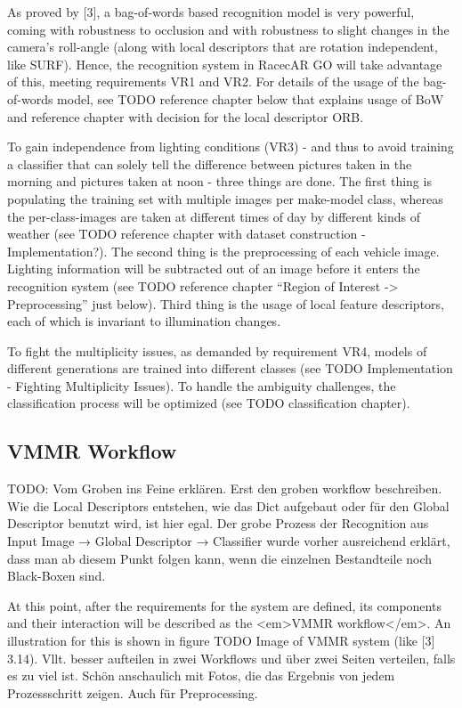 As proved by [3], a bag-of-words based recognition model is very powerful, coming with robustness to occlusion and with robustness to slight changes in the camera’s roll-angle (along with local descriptors that are rotation independent, like SURF). Hence, the recognition system in RacecAR GO will take advantage of this, meeting requirements VR1 and VR2. For details of the usage of the bag-of-words model, see TODO reference chapter below that explains usage of BoW and reference chapter with decision for the local descriptor ORB.

To gain independence from lighting conditions (VR3) - and thus to avoid training a classifier that can solely tell the difference between pictures taken in the morning and pictures taken at noon - three things are done. The first thing is populating the training set with multiple images per make-model class, whereas the per-class-images are taken at different times of day by different kinds of weather (see TODO reference chapter with dataset construction - Implementation?). The second thing is the preprocessing of each vehicle image. Lighting information will be subtracted out of an image before it enters the recognition system (see TODO reference chapter “Region of Interest -> Preprocessing” just below). Third thing is the usage of local feature descriptors, each of which is invariant to illumination changes.

To fight the multiplicity issues, as demanded by requirement VR4, models of different generations are trained into different classes (see TODO Implementation - Fighting Multiplicity Issues). To handle the ambiguity challenges, the classification process will be optimized (see TODO classification chapter).

\subsection{VMMR Workflow}
TODO: Vom Groben ins Feine erklären. Erst den groben workflow beschreiben. Wie die Local Descriptors entstehen, wie das Dict aufgebaut oder für den Global Descriptor benutzt wird, ist hier egal. Der grobe Prozess der Recognition aus Input Image → Global Descriptor → Classifier wurde vorher ausreichend erklärt, dass man ab diesem Punkt folgen kann, wenn die einzelnen Bestandteile noch Black-Boxen sind.

At this point, after the requirements for the system are defined, its components and their interaction will be described as the <em>VMMR workflow</em>. An illustration for this is shown in figure TODO Image of VMMR system (like [3] 3.14). Vllt. besser aufteilen in zwei Workflows und über zwei Seiten verteilen, falls es zu viel ist. Schön anschaulich mit Fotos, die das Ergebnis von jedem Prozessschritt zeigen. Auch für Preprocessing.

